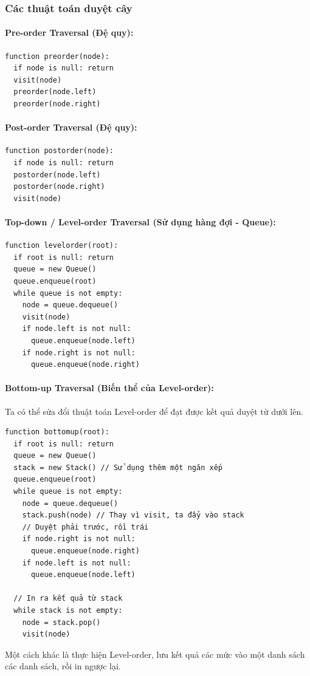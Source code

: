 \documentclass[a4paper,12pt]{article}
\begin{document}
\subsubsection{Các thuật toán duyệt cây}
\paragraph{Pre-order Traversal (Đệ quy):}
\begin{verbatim}
function preorder(node):
  if node is null: return
  visit(node)
  preorder(node.left)
  preorder(node.right)
\end{verbatim}

\paragraph{Post-order Traversal (Đệ quy):}
\begin{verbatim}
function postorder(node):
  if node is null: return
  postorder(node.left)
  postorder(node.right)
  visit(node)
\end{verbatim}

\paragraph{Top-down / Level-order Traversal (Sử dụng hàng đợi - Queue):}
\begin{verbatim}
function levelorder(root):
  if root is null: return
  queue = new Queue()
  queue.enqueue(root)
  while queue is not empty:
    node = queue.dequeue()
    visit(node)
    if node.left is not null:
      queue.enqueue(node.left)
    if node.right is not null:
      queue.enqueue(node.right)
\end{verbatim}

\paragraph{Bottom-up Traversal (Biến thể của Level-order):}
Ta có thể sửa đổi thuật toán Level-order để đạt được kết quả duyệt từ dưới lên.
\begin{verbatim}
function bottomup(root):
  if root is null: return
  queue = new Queue()
  stack = new Stack() // Sử dụng thêm một ngăn xếp
  queue.enqueue(root)
  while queue is not empty:
    node = queue.dequeue()
    stack.push(node) // Thay vì visit, ta đẩy vào stack
    // Duyệt phải trước, rồi trái
    if node.right is not null:
      queue.enqueue(node.right)
    if node.left is not null:
      queue.enqueue(node.left)
  
  // In ra kết quả từ stack
  while stack is not empty:
    node = stack.pop()
    visit(node)
\end{verbatim}
Một cách khác là thực hiện Level-order, lưu kết quả các mức vào một danh sách các danh sách, rồi in ngược lại.
\end{document}
